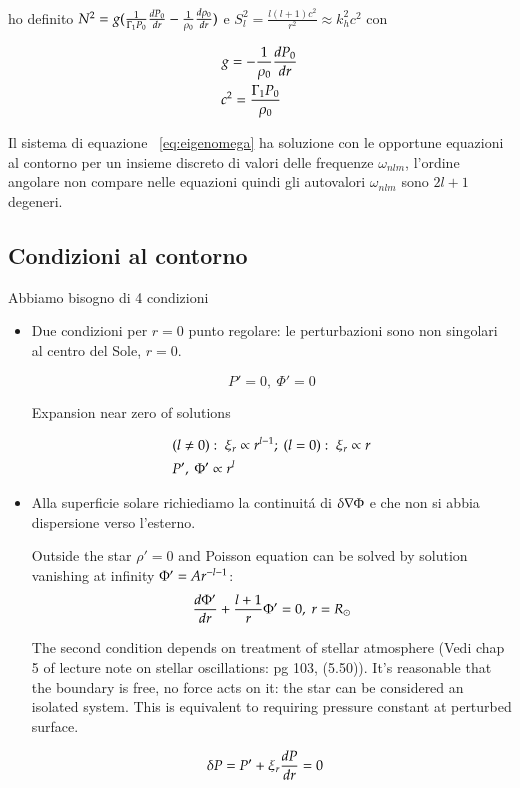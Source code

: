 \documentclass[../main.tex]{subfiles}
\begin{document}
ho definito $N^2=g(\frac{1}{\Gamma_1P_0}\TDy{r}{P_0}-\frac{1}{\rho_0}\TDy{r}{\rho_0})$ e $S_l^2=\frac{l(l+1)c^2}{r^2}\approx k_h^2c^2$ con

\begin{align*}
&g=-\frac{1}{\rho_0}\TDy{r}{P_0}\\
&c^2=\frac{\Gamma_1P_0}{\rho_0}
\end{align*}


Il sistema di equazione ~\ref{eq:eigenomega} ha soluzione con le opportune equazioni al contorno per un insieme discreto di valori delle frequenze $\omega_{nlm}$, l'ordine angolare non compare nelle equazioni quindi gli autovalori $\omega_{nlm}$ sono $2l+1$ degeneri.

\subsection{Condizioni al contorno}

Abbiamo bisogno di 4 condizioni

\begin{itemize}
\item Due condizioni per $r=0$ punto regolare: le perturbazioni sono non singolari al centro del Sole, $r=0$.

\begin{equation*}
P'=0,\ \Phi'=0
\end{equation*}

Expansion near zero of solutions

\begin{align*}
&(l\neq0):\ \xi_r\propto r\expy{l-1};\ (l=0):\ \xi_r\propto r\\
&P',\ \Phi'\propto r^l
\end{align*}

\item Alla superficie solare richiediamo la continuit\'a di $\Lvar{\nabla\Phi}$ e che non si abbia dispersione verso l'esterno.

Outside the star $\rho'=0$ and Poisson equation can be solved by solution vanishing at infinity $\Phi'=Ar\expy{-l-1}$:
\begin{equation*}
\TDy{r}{\Phi'}+\frac{l+1}{r}\Phi'=0,\ r=\rsun{}    
\end{equation*}

The second condition depends on treatment of stellar atmosphere (Vedi chap 5 of lecture note on stellar oscillations: pg 103, (5.50)). It's reasonable that the boundary is free, no force acts on it: the star can be considered an isolated system. This is equivalent to requiring pressure constant at perturbed surface.

\begin{align*}
&\Lvar{P}=P'+\xi_r\TDy{r}{P}=0
\end{align*}

\end{itemize}
\end{document}
